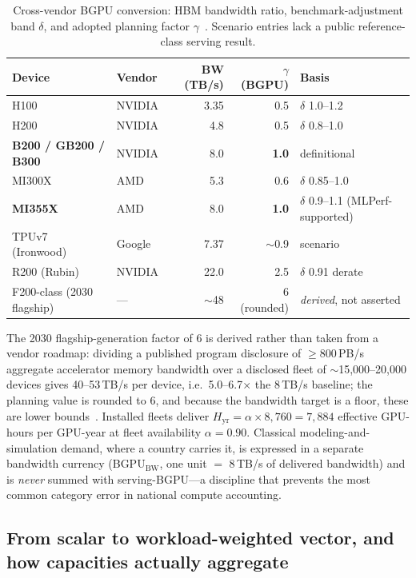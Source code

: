 \begin{table}[htbp]
  \centering
  \small
  \caption{Cross-vendor BGPU conversion: HBM bandwidth ratio, benchmark-adjustment band $\delta$, and adopted planning factor $\gamma$~\cite{ai4s-framework}. Scenario entries lack a public reference-class serving result.}
  \label{tab:bgpu}
  \begin{tabular}{llrrl}
    \toprule
    Device & Vendor & BW (TB/s) & $\gamma$ (BGPU) & Basis \\
    \midrule
    H100 & NVIDIA & 3.35 & 0.5 & $\delta$ 1.0--1.2 \\
    H200 & NVIDIA & 4.8 & 0.5 & $\delta$ 0.8--1.0 \\
    \textbf{B200 / GB200 / B300} & NVIDIA & 8.0 & \textbf{1.0} & definitional \\
    MI300X & AMD & 5.3 & 0.6 & $\delta$ 0.85--1.0 \\
    \textbf{MI355X} & AMD & 8.0 & \textbf{1.0} & $\delta$ 0.9--1.1 (MLPerf-supported) \\
    TPUv7 (Ironwood) & Google & 7.37 & $\sim$0.9 & scenario \\
    R200 (Rubin) & NVIDIA & 22.0 & 2.5 & $\delta$ 0.91 derate \\
    F200-class (2030 flagship) & --- & $\sim$48 & 6 (rounded) & \emph{derived}, not asserted \\
    \bottomrule
  \end{tabular}
\end{table}

The 2030 flagship-generation factor of 6 is derived rather than taken from a vendor roadmap: dividing a published program disclosure of $\geq$800\,PB/s aggregate accelerator memory bandwidth over a disclosed fleet of $\sim$15,000--20,000 devices gives 40--53\,TB/s per device, i.e.\ 5.0--6.7$\times$ the 8\,TB/s baseline; the planning value is rounded to 6, and because the bandwidth target is a floor, these are lower bounds~\cite{ai4s-framework}. Installed fleets deliver $H_{\mathrm{yr}} = \alpha\times 8{,}760 = 7{,}884$ effective GPU-hours per GPU-year at fleet availability $\alpha=0.90$. Classical modeling-and-simulation demand, where a country carries it, is expressed in a separate bandwidth currency (BGPU$_{\mathrm{BW}}$, one unit $=$ 8\,TB/s of delivered bandwidth) and is \emph{never} summed with serving-BGPU---a discipline that prevents the most common category error in national compute accounting.

\subsection{From scalar to workload-weighted vector, and how capacities actually aggregate}
\label{sec:bgpu-vector}

